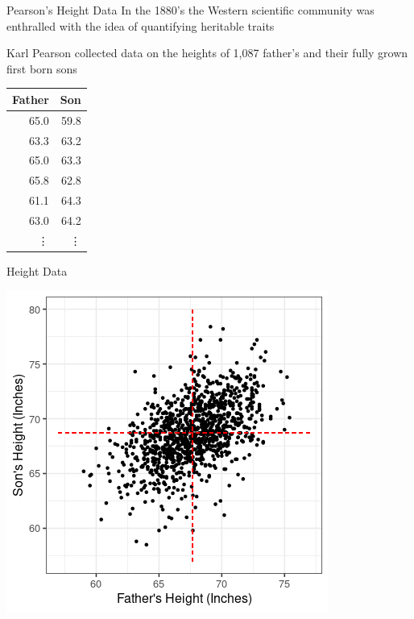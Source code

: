 \documentclass{beamer}
\begin{document}
\begin{frame}{Pearson's Height Data}
In the 1880's the Western scientific community was enthralled with the idea of quantifying heritable traits \vspace{2mm}

Karl Pearson collected data on the heights of 1,087 father's and their fully grown first born sons

\begin{table}[ht]
\centering
\begin{tabular}{rr}
  \hline
Father & Son \\ 
  \hline
65.0 & 59.8 \\ 
  63.3 & 63.2 \\ 
  65.0 & 63.3 \\ 
  65.8 & 62.8 \\ 
  61.1 & 64.3 \\ 
  63.0 & 64.2 \\  
  \vdots & \vdots \\
   \hline
\end{tabular}
\end{table}

\end{frame}

\begin{frame}{Height Data}
\begin{center}
\includegraphics[scale=0.5]{father_son.png}
\end{center}
\end{frame}
\end{document}
